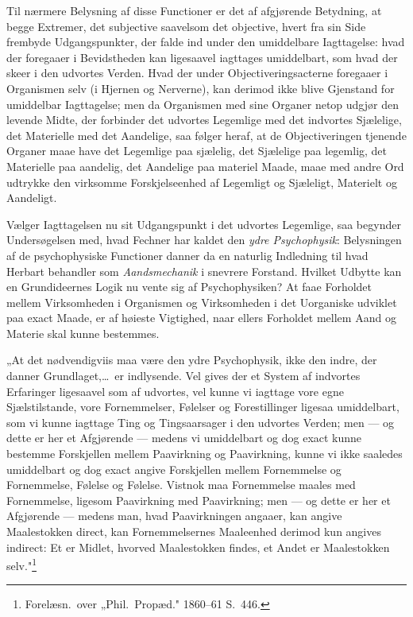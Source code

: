 \documentclass[12pt]{book}
\newcommand{\opage}[1]{\marginnote{\footnotesize\textit{[#1]}}}
\begin{document}
\opage{413} Til nærmere Belysning af disse Functioner er det af afgjørende Betydning, at begge Extremer, det
subjective saavelsom det objective, hvert fra sin Side frembyde Udgangspunkter, der falde ind under
den umiddelbare Iagttagelse: hvad der foregaaer i Bevidstheden kan ligesaavel iagttages umiddelbart,
som hvad der skeer i den udvortes Verden. Hvad der under Objectiveringsacterne foregaaer i Organismen
selv (i Hjernen og Nerverne), kan derimod ikke blive Gjenstand for umiddelbar Iagttagelse; men da
Organismen med sine Organer netop udgjør den levende Midte, der forbinder det udvortes Legemlige med
det indvortes Sjælelige, det Materielle med det Aandelige, saa følger heraf, at de Objectiveringen
tjenende Organer maae have det Legemlige paa sjælelig, det Sjælelige paa legemlig, det Materielle paa
aandelig, det Aandelige paa materiel Maade, maae med andre Ord udtrykke den virksomme
Forskjelseenhed af Legemligt og Sjæleligt, Materielt og Aandeligt.

Vælger Iagttagelsen nu sit Udgangspunkt i det udvortes Legemlige, saa begynder Undersøgelsen med,
hvad Fechner har kaldet den \emph{ydre Psychophysik}: Belysningen af de psychophysiske Functioner
danner da en naturlig Indledning til hvad Herbart behandler som \emph{Aandsmechanik} i snevrere
Forstand. Hvilket Udbytte kan en Grundideernes Logik nu vente sig af Psychophysiken? At faae
Forholdet mellem Virksomheden i Organismen og Virksomheden i det Uorganiske udviklet paa exact Maade,
er af høieste Vigtighed, naar ellers Forholdet mellem Aand og Materie skal kunne bestemmes.

„At det nødvendigviis maa være den ydre Psychophysik, ikke den indre, der danner Grundlaget,\ldots\
er indlysende. Vel gives der et System af indvortes Erfaringer ligesaavel som af udvortes, vel kunne
vi iagttage vore egne Sjælstilstande, vore Fornemmelser, Følelser og Forestillinger ligesaa
umiddelbart, som vi kunne iagttage Ting og Tingsaarsager i den udvortes Verden; men — og dette er her
et Afgjørende
\opage{414} — medens vi umiddelbart og dog exact kunne bestemme Forskjellen mellem Paavirkning og Paavirkning,
kunne vi ikke saaledes umiddelbart og dog exact angive Forskjellen mellem Fornemmelse og Fornemmelse,
Følelse og Følelse. Vistnok maa Fornemmelse maales med Fornemmelse, ligesom Paavirkning med
Paavirkning; men — og dette er her et Afgjørende — medens man, hvad Paavirkningen angaaer, kan angive
Maalestokken direct, kan Fornemmelsernes Maaleenhed derimod kun angives indirect: Et er Midlet,
hvorved Maalestokken findes, et Andet er Maalestokken selv."\footnote{Forelæsn.\ over „Phil.\ Propæd."
1860--61 S.~446.}
\end{document}
